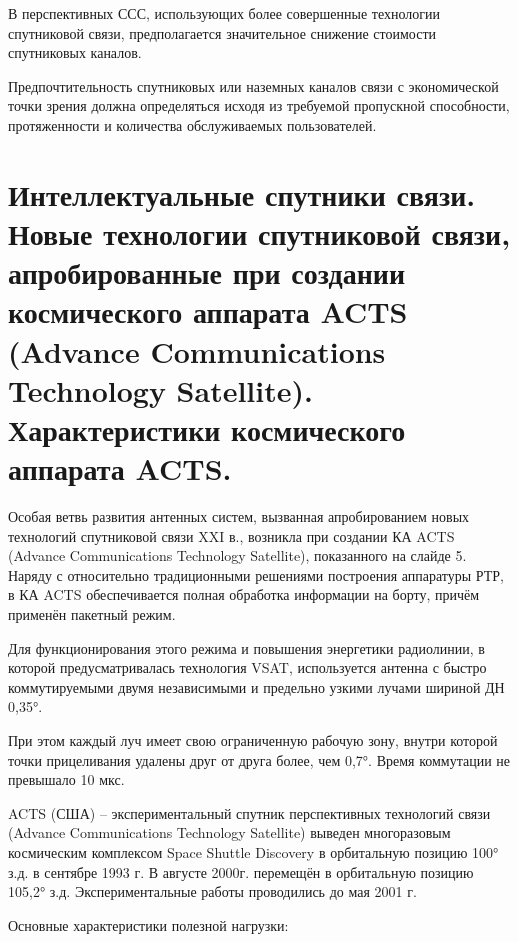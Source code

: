 \documentclass[14pt,a4paper,oneside]{extarticle}
\begin{document}
В перспективных ССС, использующих более совершенные технологии спутниковой связи, предполагается значительное снижение стоимости спутниковых каналов.

Предпочтительность спутниковых или наземных каналов связи с экономической точки зрения должна определяться исходя из требуемой пропускной способности, протяженности и количества обслуживаемых пользователей.

\section{Интеллектуальные спутники связи. Новые технологии спутниковой связи, апробированные при создании космического аппарата ACTS (Advance Communications Technology Satellite). Характеристики космического аппарата ACTS.}

Особая ветвь развития антенных систем, вызванная апробированием новых технологий спутниковой связи XXI в., возникла при создании КА ACTS (Advance Communications Technology Satellite), показанного на слайде 5. Наряду с относительно традиционными решениями построения аппаратуры РТР, в КА ACTS обеспечивается полная обработка информации на борту, причём применён пакетный режим.

Для функционирования этого режима и повышения энергетики радиолинии, в которой предусматривалась технология VSAT, используется антенна с быстро коммутируемыми двумя независимыми и предельно узкими лучами шириной ДН 0,35°.

При этом каждый луч имеет свою ограниченную рабочую зону, внутри которой точки прицеливания удалены друг от друга более, чем 0,7°. Время коммутации не превышало 10 мкс.

ACTS (США) – экспериментальный спутник перспективных технологий связи (Advance Communications Technology Satellite) выведен многоразовым космическим комплексом Space Shuttle Discovery в орбитальную позицию 100° з.д. в сентябре 1993 г. В августе 2000г. перемещён в орбитальную позицию 105,2° з.д. Экспериментальные работы проводились до мая 2001 г.

Основные характеристики полезной нагрузки:
\end{document}
